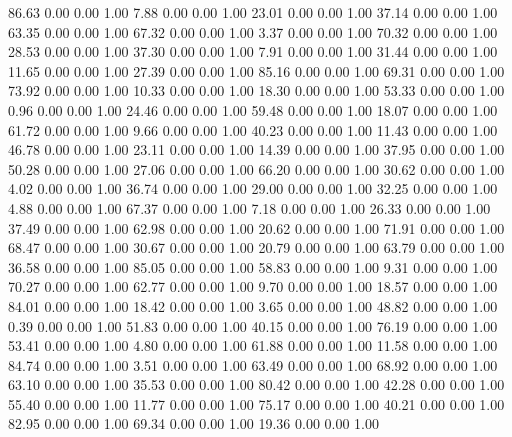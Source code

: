    86.63   0.00   0.00   1.00
    7.88   0.00   0.00   1.00
   23.01   0.00   0.00   1.00
   37.14   0.00   0.00   1.00
   63.35   0.00   0.00   1.00
   67.32   0.00   0.00   1.00
    3.37   0.00   0.00   1.00
   70.32   0.00   0.00   1.00
   28.53   0.00   0.00   1.00
   37.30   0.00   0.00   1.00
    7.91   0.00   0.00   1.00
   31.44   0.00   0.00   1.00
   11.65   0.00   0.00   1.00
   27.39   0.00   0.00   1.00
   85.16   0.00   0.00   1.00
   69.31   0.00   0.00   1.00
   73.92   0.00   0.00   1.00
   10.33   0.00   0.00   1.00
   18.30   0.00   0.00   1.00
   53.33   0.00   0.00   1.00
    0.96   0.00   0.00   1.00
   24.46   0.00   0.00   1.00
   59.48   0.00   0.00   1.00
   18.07   0.00   0.00   1.00
   61.72   0.00   0.00   1.00
    9.66   0.00   0.00   1.00
   40.23   0.00   0.00   1.00
   11.43   0.00   0.00   1.00
   46.78   0.00   0.00   1.00
   23.11   0.00   0.00   1.00
   14.39   0.00   0.00   1.00
   37.95   0.00   0.00   1.00
   50.28   0.00   0.00   1.00
   27.06   0.00   0.00   1.00
   66.20   0.00   0.00   1.00
   30.62   0.00   0.00   1.00
    4.02   0.00   0.00   1.00
   36.74   0.00   0.00   1.00
   29.00   0.00   0.00   1.00
   32.25   0.00   0.00   1.00
    4.88   0.00   0.00   1.00
   67.37   0.00   0.00   1.00
    7.18   0.00   0.00   1.00
   26.33   0.00   0.00   1.00
   37.49   0.00   0.00   1.00
   62.98   0.00   0.00   1.00
   20.62   0.00   0.00   1.00
   71.91   0.00   0.00   1.00
   68.47   0.00   0.00   1.00
   30.67   0.00   0.00   1.00
   20.79   0.00   0.00   1.00
   63.79   0.00   0.00   1.00
   36.58   0.00   0.00   1.00
   85.05   0.00   0.00   1.00
   58.83   0.00   0.00   1.00
    9.31   0.00   0.00   1.00
   70.27   0.00   0.00   1.00
   62.77   0.00   0.00   1.00
    9.70   0.00   0.00   1.00
   18.57   0.00   0.00   1.00
   84.01   0.00   0.00   1.00
   18.42   0.00   0.00   1.00
    3.65   0.00   0.00   1.00
   48.82   0.00   0.00   1.00
    0.39   0.00   0.00   1.00
   51.83   0.00   0.00   1.00
   40.15   0.00   0.00   1.00
   76.19   0.00   0.00   1.00
   53.41   0.00   0.00   1.00
    4.80   0.00   0.00   1.00
   61.88   0.00   0.00   1.00
   11.58   0.00   0.00   1.00
   84.74   0.00   0.00   1.00
    3.51   0.00   0.00   1.00
   63.49   0.00   0.00   1.00
   68.92   0.00   0.00   1.00
   63.10   0.00   0.00   1.00
   35.53   0.00   0.00   1.00
   80.42   0.00   0.00   1.00
   42.28   0.00   0.00   1.00
   55.40   0.00   0.00   1.00
   11.77   0.00   0.00   1.00
   75.17   0.00   0.00   1.00
   40.21   0.00   0.00   1.00
   82.95   0.00   0.00   1.00
   69.34   0.00   0.00   1.00
   19.36   0.00   0.00   1.00

